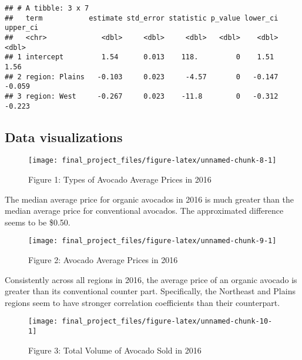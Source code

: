 \documentclass[
]{article}
\begin{document}
\begin{verbatim}
## # A tibble: 3 x 7
##   term           estimate std_error statistic p_value lower_ci upper_ci
##   <chr>             <dbl>     <dbl>     <dbl>   <dbl>    <dbl>    <dbl>
## 1 intercept         1.54      0.013    118.         0    1.51     1.56 
## 2 region: Plains   -0.103     0.023     -4.57       0   -0.147   -0.059
## 3 region: West     -0.267     0.023    -11.8        0   -0.312   -0.223
\end{verbatim}

\hypertarget{data-visualizations}{%
\subsection{Data visualizations}\label{data-visualizations}}

\begin{figure}

{\centering \texttt{[image: final\_project\_files/figure-latex/unnamed-chunk-8-1]} 

}

\caption{Figure 1: Types of Avocado Average Prices in 2016}\label{fig:unnamed-chunk-8}
\end{figure}

The median average price for organic avocados in 2016 is much greater
than the median average price for conventional avocados. The
approximated difference seems to be \$0.50.

\begin{figure}

{\centering \texttt{[image: final\_project\_files/figure-latex/unnamed-chunk-9-1]} 

}

\caption{Figure 2: Avocado Average Prices in 2016}\label{fig:unnamed-chunk-9}
\end{figure}

Consistently across all regions in 2016, the average price of an organic
avocado is greater than its conventional counter part. Specifically, the
Northeast and Plains regions seem to have stronger correlation
coefficients than their counterpart.

\begin{figure}

{\centering \texttt{[image: final\_project\_files/figure-latex/unnamed-chunk-10-1]} 

}

\caption{Figure 3: Total Volume of Avocado Sold in 2016}\label{fig:unnamed-chunk-10}
\end{figure}
\end{document}
